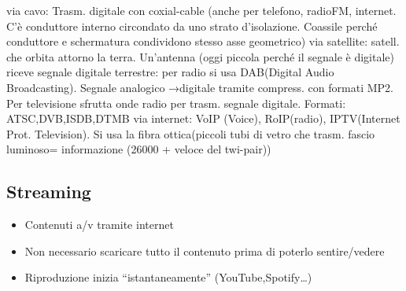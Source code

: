 \documentclass[8pt,a4paper]{article}
\begin{document}
\begin{multicols}{5}
\begin{itemize}
\begin{itemize}
      \end{itemize}
    \end{itemize}
    via cavo: Trasm. digitale con coxial-cable (anche per telefono, radioFM, internet. C’è conduttore interno circondato da uno strato d’isolazione. Coassile perché conduttore e schermatura condividono stesso asse geometrico)
    via satellite: satell. che orbita attorno la terra. Un’antenna (oggi piccola perché il segnale è digitale) riceve segnale
    digitale terrestre: per radio si usa DAB(Digital Audio Broadcasting). Segnale analogico →digitale tramite compress. con formati MP2. Per televisione sfrutta onde radio per trasm. segnale digitale. Formati: ATSC,DVB,ISDB,DTMB
    via internet: VoIP (Voice), RoIP(radio), IPTV(Internet Prot. Television). Si usa la fibra ottica(piccoli tubi di vetro che trasm. fascio luminoso= informazione (26000 + veloce del twi-pair))

    \subsection{Streaming}
    \begin{itemize}
      \item Contenuti a/v tramite internet
      \item Non necessario scaricare tutto il contenuto prima di poterlo sentire/vedere
      \item Riproduzione inizia “istantaneamente” (YouTube,Spotify…)
    \end{itemize}


\end{multicols}
\end{document}
